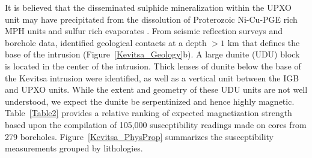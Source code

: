\documentclass[paper]{geophysics}
\begin{document}
It is believed that the disseminated sulphide mineralization within the UPXO unit may have precipitated from the dissolution of Proterozoic Ni-Cu-PGE rich MPH units and sulfur rich evaporates \cite[]{Mutanen1997}. From seismic reflection surveys and borehole data, \cite{Koivisto2015} identified geological contacts at a depth $>1$ km that defines the base of the intrusion (Figure~\ref{Kevitsa_Geology}b).
A large dunite (UDU) block is located in the center of the intrusion. Thick lenses of dunite below the base of the Kevitsa intrusion were identified, as well as a vertical unit between the IGB and UPXO units. While the extent and geometry of these UDU units are not well understood, we expect the dunite be serpentinized and hence highly magnetic.
Table~\ref{Table2} provides a relative ranking of expected magnetization strength based upon the compilation of 105,000 susceptibility readings made on cores from 279 boreholes. Figure~\ref{Kevitsa_PhysProp} summarizes the susceptibility measurements grouped by lithologies.


\end{document}
